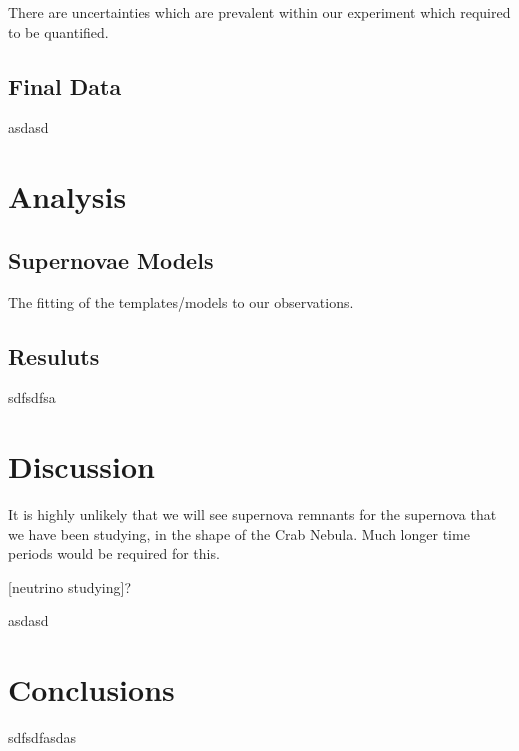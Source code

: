\documentclass[twocolumn]{revtex4}
\begin{document}
There are uncertainties which are prevalent within our experiment which required to be quantified.

\vspace{-3ex}
\subsection{Final Data}
\vspace{-2ex}

asdasd

\vspace{-3ex}
\section{Analysis}
\vspace{-2ex}
\subsection{Supernovae Models}
\vspace{-2ex}

The fitting of the templates/models to our observations.

\vspace{-3ex}
\subsection{Resuluts}
\vspace{-2ex}

sdfsdfsa

\vspace{-3ex}
\section{Discussion}
\vspace{-2ex}

It is highly unlikely that we will see supernova remnants for the supernova that we have been studying, in the shape of the Crab Nebula. Much longer time periods would be required for this. 

[neutrino studying]?

asdasd

\vspace{-5ex}
\section{Conclusions}
\vspace{-2ex}

sdfsdfasdas
\end{document}
